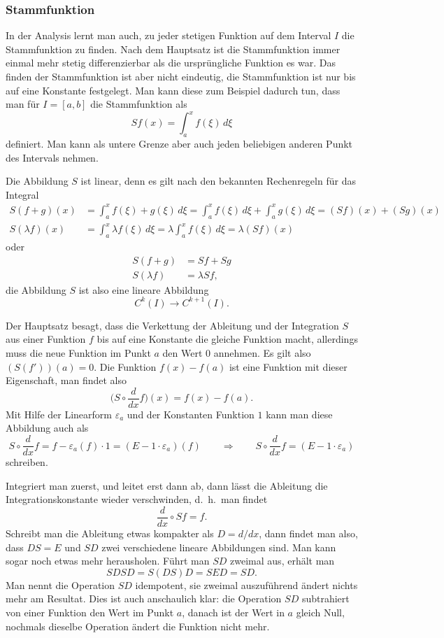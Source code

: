 \subsubsection{Stammfunktion}
In der Analysis lernt man auch, zu jeder stetigen Funktion auf dem
Interval $I$ die Stammfunktion zu finden. 
Nach dem Hauptsatz ist die Stammfunktion immer einmal mehr stetig
differenzierbar als die ursprüngliche Funktion es war.
Das finden der Stammfunktion ist aber nicht eindeutig, die Stammfunktion
ist nur bis auf eine Konstante festgelegt.
Man kann diese zum Beispiel dadurch tun, dass man für $I=[a,b]$ die
Stammfunktion als
\[
Sf(x) = \int_a^x f(\xi)\,d\xi
\]
definiert.
Man kann als untere Grenze aber auch jeden beliebigen anderen Punkt
des Intervals nehmen.

Die Abbildung $S$ ist linear, denn es gilt nach den bekannten
Rechenregeln für das Integral
\begin{align*}
S(f+g)(x)
&=
\int_a^x f(\xi) + g(\xi)\,d\xi
=
\int_a^x f(\xi)\,d\xi + \int_a^xg(\xi)\,d\xi
=
(Sf)(x) + (Sg)(x)
\\
S(\lambda f)(x)
&=
\int_a^x \lambda f(\xi)\,d\xi
=
\lambda \int_a^x f(\xi)\,d\xi
=
\lambda (Sf)(x)
\end{align*}
oder
\begin{align*}
S(f+g)&=Sf+Sg
\\
S(\lambda f)&=\lambda Sf,
\end{align*}
die Abbildung $S$ ist also eine lineare Abbildung
\[
C^k(I)\to C^{k+1}(I).
\]

Der Hauptsatz besagt, dass  die Verkettung der Ableitung und der Integration
$S$ aus einer Funktion $f$ bis auf eine Konstante die gleiche Funktion
macht, allerdings muss die neue Funktion im Punkt $a$ den Wert $0$ annehmen.
Es gilt also $ (S(f'))(a) = 0 $.
Die Funktion $f(x)-f(a)$ ist eine Funktion mit dieser Eigenschaft, man findet
also
\[
\biggl(S\circ \frac{d}{dx} f\biggr) (x)
=
f(x)-f(a).
\]
Mit Hilfe der Linearform $\varepsilon_a$ und der Konstanten Funktion $1$ kann
man diese Abbildung auch als
\[
S\circ \frac{d}{dx} f
=
f - \varepsilon_a(f) \cdot 1
=
(E-1\cdot\varepsilon_a)(f)
\qquad\Rightarrow\qquad
S\circ \frac{d}{dx}f
=
(E-1\cdot \varepsilon_a)
\]
schreiben.

Integriert man zuerst, und leitet erst dann ab, dann lässt die Ableitung
die Integrationskonstante wieder verschwinden, d.~h.~man findet
\[
\frac{d}{dx}\circ S f = f.
\]
Schreibt man die Ableitung etwas kompakter als $D=d/dx$, dann findet man
also, dass
$DS=E$ und $SD$ zwei verschiedene lineare Abbildungen sind.
Man kann sogar noch etwas mehr herausholen.
Führt man $SD$ zweimal aus, erhält man
\[
SDSD = S(DS)D=SED=SD.
\]
Man nennt die Operation $SD$ idempotent, sie zweimal auszuführend ändert
nichts mehr am Resultat.
Dies ist auch anschaulich klar: die Operation $SD$ subtrahiert von einer
Funktion den Wert im Punkt $a$, danach ist der Wert in $a$ gleich Null,
nochmals dieselbe Operation ändert die Funktion nicht mehr.

